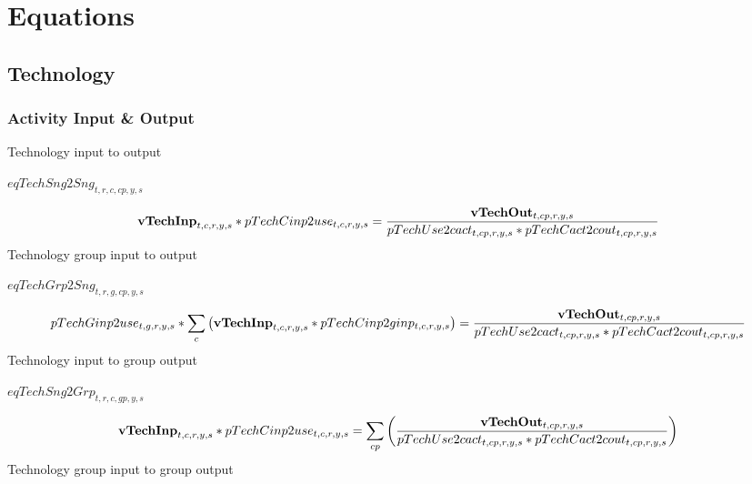 \documentclass{article}
\begin{document}
\section*{Equations}
\subsection*{Technology}
\subsubsection*{Activity Input \& Output}
Technology input to output







$eqTechSng2Sng_{t,r,c,cp,y,s}$





\begin{dmath}
{\bf vTechInp}_{t,c,r,y,s}*pTechCinp2use_{t,c,r,y,s}  =  \frac{{\bf vTechOut}_{t,cp,r,y,s}}{pTechUse2cact_{t,cp,r,y,s}*pTechCact2cout_{t,cp,r,y,s}}
\end{dmath}
Technology group input to output







$eqTechGrp2Sng_{t,r,g,cp,y,s}$





\begin{dmath}
pTechGinp2use_{t,g,r,y,s}*\sum_{c}{\left({\bf vTechInp}_{t,c,r,y,s}*pTechCinp2ginp_{t,c,r,y,s}\right)}  =  \frac{{\bf vTechOut}_{t,cp,r,y,s}}{pTechUse2cact_{t,cp,r,y,s}*pTechCact2cout_{t,cp,r,y,s}}
\end{dmath}
Technology input to group output







$eqTechSng2Grp_{t,r,c,gp,y,s}$





\begin{dmath}
{\bf vTechInp}_{t,c,r,y,s}*pTechCinp2use_{t,c,r,y,s}  =  \sum_{cp}{\left(\frac{{\bf vTechOut}_{t,cp,r,y,s}}{pTechUse2cact_{t,cp,r,y,s}*pTechCact2cout_{t,cp,r,y,s}}\right)}
\end{dmath}
Technology group input to group output
\end{document}
